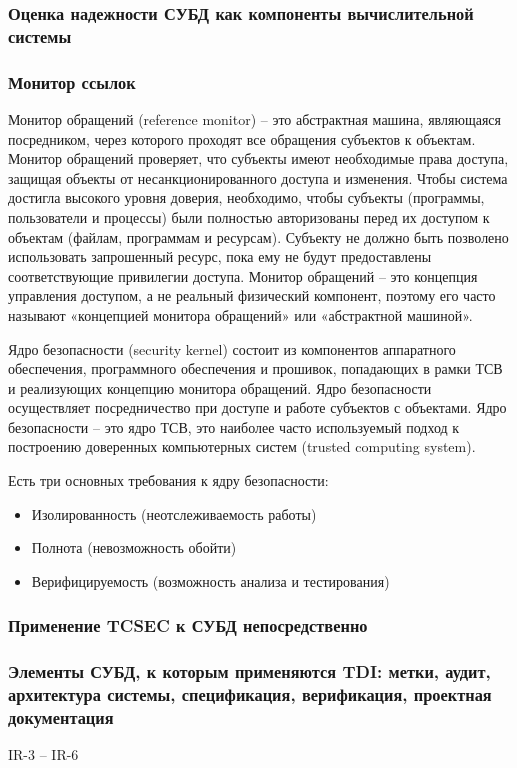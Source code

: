 \subsubsection{Оценка надежности СУБД как компоненты вычислительной системы}
\subsubsection{Монитор ссылок}
Монитор обращений (reference monitor) – это абстрактная машина, являющаяся посредником, через которого проходят все обращения субъектов к объектам. Монитор обращений проверяет, что субъекты имеют необходимые права доступа, защищая объекты от несанкционированного доступа и изменения.
Чтобы система достигла высокого уровня доверия, необходимо, чтобы субъекты (программы, пользователи и процессы) были полностью авторизованы перед их доступом к объектам (файлам, программам и ресурсам).
Субъекту не должно быть позволено использовать запрошенный ресурс, пока ему не будут предоставлены соответствующие привилегии доступа. Монитор обращений – это концепция управления доступом, а не реальный физический компонент, поэтому его часто называют «концепцией монитора обращений» или «абстрактной машиной». \cite{CISSP}

Ядро безопасности (security kernel) состоит из компонентов аппаратного обеспечения, программного обеспечения и прошивок, попадающих в рамки ТСВ и реализующих концепцию монитора обращений.
Ядро безопасности осуществляет посредничество при доступе и работе субъектов с объектами. Ядро безопасности – это ядро ТСВ, это наиболее часто используемый подход к построению доверенных компьютерных систем (trusted computing system). \cite{CISSP}

Есть три основных требования к ядру безопасности:
\begin{itemize}
	\item Изолированность (неотслеживаемость работы)
	\item Полнота (невозможность обойти)
	\item Верифицируемость (возможность анализа и тестирования)
\end{itemize}

\subsubsection{Применение TCSEC к СУБД непосредственно}
\subsubsection{Элементы СУБД, к которым применяются TDI: метки, аудит, архитектура системы, спецификация, верификация, проектная документация}
	\cite{PurpleBook} IR-3 -- IR-6
